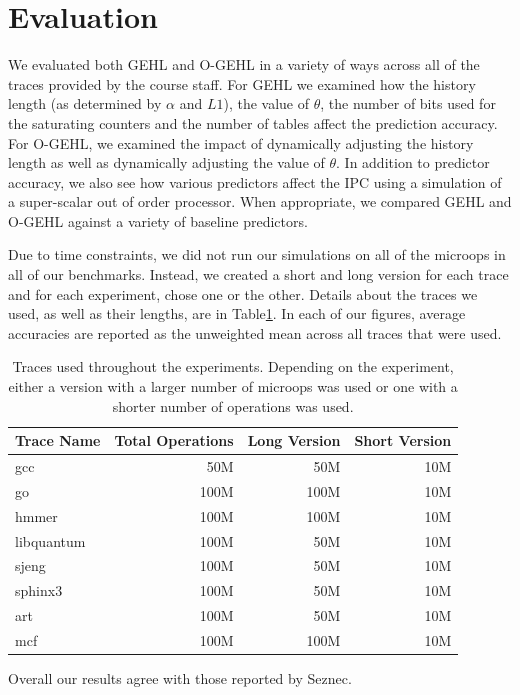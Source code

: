 \section{Evaluation}
\label{sec:eval}
We evaluated both GEHL and O-GEHL in a variety of ways across all of the traces provided by the course staff.  For GEHL we examined how the history length (as determined by $\alpha$ and $L1$), the value of $\theta$, the number of bits used for the saturating counters and the number of tables affect the prediction accuracy.  For O-GEHL, we examined the impact of dynamically adjusting the history length as well as dynamically adjusting the value of $\theta$.  In addition to predictor accuracy, we also see how various predictors affect the IPC using a simulation of a super-scalar out of order processor.  When appropriate, we compared GEHL and O-GEHL against a variety of baseline predictors.

Due to time constraints, we did not run our simulations on all of the microops in all of our benchmarks.  Instead, we created a short and long version for each trace and for each experiment, chose one or the other.  Details about the traces we used, as well as their lengths, are in Table\ref{table:traces}.  In each of our figures, average accuracies are reported as the unweighted mean across all traces that were used.
\begin{table}
  \centering
  \begin{tabular}{l|r|r|r}
    Trace Name & Total Operations & Long Version & Short Version \\ \hline
    gcc & 50M & 50M & 10M \\
    go & 100M & 100M  & 10M \\
    hmmer & 100M & 100M & 10M \\
    libquantum & 100M & 50M & 10M\\
    sjeng & 100M &50M & 10M \\
    sphinx3 &100M & 50M & 10M \\
    art & 100M & 50M & 10M\\
    mcf & 100M & 100M & 10M\\
 \end{tabular}
 \caption{Traces used throughout the experiments.  Depending on the experiment, either a version with a larger number of microops was used or one with a shorter number of operations was used.}
 \label{table:traces}
\end{table}

Overall our results agree with those reported by Seznec.\cite{seznec2005analysis}\cite{ogehl}

